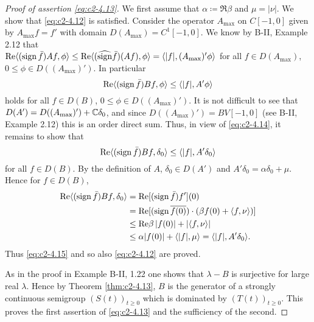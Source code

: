 \begin{proof}[Proof of assertion \eqref{eq:c2-4.13}]
We first assume that $\alpha \coloneqq \Re  \beta$ and $\mu = |\nu|$.
We show that \eqref{eq:c2-4.12} is satisfied.
Consider the operator $A_{\max}$ on $C[-1,0]$ given by $A_{\max}f = f'$ with domain $D(A_{\max}) = C^{1}[-1,0]$.
We know by B-II, Example 2.12 
that \\ $\mathop{}\!\mathrm{Re}\langle(\operatorname{sign}  \bar{f})Af,\phi\rangle \leq \mathop{}\!\mathrm{Re}\langle(\widehat{\operatorname{sign}}  \bar{f})(Af),\phi\rangle = \langle|f|, (A_{\max})'\phi\rangle$ for all $f \in D(A_{\max})$, $0 \leq \phi \in D((A_{\max})')$.
In particular
\begin{equation}\label{eq:c2-4.14}
\mathop{}\!\mathrm{Re}\langle(\operatorname{sign}  \bar{f})Bf,\phi\rangle \leq \langle|f|,A'\phi\rangle
\end{equation}
holds for all $f \in D(B)$, $0 \leq \phi \in D((A_{\max})')$.
It is not difficult to see that $D(A') = D((A_{\max})') + \mathbb{C}\delta_{0}$, and since $D((A_{\max})') = BV[-1,0]$
(see B-II, Example 2.12)
this is an order direct sum.
Thus, in view of \eqref{eq:c2-4.14}, it remains to show that
\begin{equation}\label{eq:c2-4.15}
\mathop{}\!\mathrm{Re}\langle(\operatorname{sign}  \bar{f})Bf,\delta_{0}\rangle \leq \langle|f|,A'\delta_{0}\rangle
\end{equation}
for all $f \in D(B)$.
By the definition of $A$, $\delta_{0} \in D(A')$ and $A'\delta_{0} =  \alpha\delta_{0} + \mu$.
Hence for $f \in D(B)$,
\begin{align*}
\mathop{}\!\mathrm{Re}\langle(\operatorname{sign} \bar{f})Bf,\delta_{0}\rangle &= \mathop{}\!\mathrm{Re}[(\operatorname{sign} \bar{f})f'](0) \\
&= \mathop{}\!\mathrm{Re}[(\operatorname{sign}  \overline{f(0)})\cdot(\beta f(0) +  \langle f,\nu\rangle)] \\
&\leq \mathop{}\!\mathrm{Re}\beta \, |f(0)| + |\langle f,\nu\rangle| \\
&\leq \alpha|f(0)| + \langle|f|,\mu\rangle = \langle|f|,A'\delta_{0}\rangle.
\end{align*}
Thus \eqref{eq:c2-4.15} and so also \eqref{eq:c2-4.12} are proved.

As in the proof in Example B-II, 1.22 one shows that $\lambda - B$ is surjective for large real $\lambda$.
Hence by Theorem \ref{thm:c2-4.13}, $B$ is the generator of a
strongly continuous semigroup $(S(t))_{t \geq 0}$ which is dominated by
$(T(t))_{t \geq 0}$.
This proves the first assertion of \eqref{eq:c2-4.13} and the sufficiency of the second.


\end{proof}

